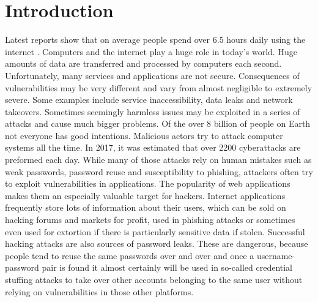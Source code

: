 \chapter{Introduction}

Latest reports show that on average people spend over 6.5 hours daily using the internet \cite{bib:digital-2023}. Computers and the internet play a huge role in today's world. Huge amounts of data are transferred and processed by computers each second. Unfortunately, many services and applications are not secure. Consequences of vulnerabilities may be very different and vary from almost negligible to extremely severe. Some examples include service inaccessibility, data leaks and network takeovers. Sometimes seemingly harmless issues may be exploited in a series of attacks and cause much bigger problems. Of the over 8 billion of people on Earth \cite{bib:UN-8B-population} not everyone has good intentions. Malicious actors try to attack computer systems all the time. In 2017, it was estimated that over 2200 cyberattacks are preformed each day. While many of those attacks rely on human mistakes such as weak passwords, password reuse and susceptibility to phishing, attackers often try to exploit vulnerabilities in applications. The popularity of web applications makes them an especially valuable target for hackers. Internet applications frequently store lots of information about their users, which can be sold on hacking forums and markets for profit, used in phishing attacks or sometimes even used for extortion if there is particularly sensitive data if stolen. Successful hacking attacks are also sources of password leaks. These are dangerous, because people tend to reuse the same passwords over and over and once a username-password pair is found it almost certainly will be used in so-called credential stuffing attacks to take over other accounts belonging to the same user without relying on vulnerabilities in those other platforms.

